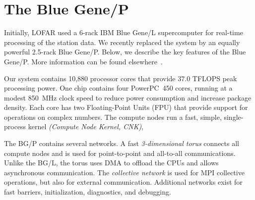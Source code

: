 \documentclass{sig-alternate}
\begin{document}
\section{The Blue Gene/P}
\label{sec:BG/P}

Initially, LOFAR used a 6-rack IBM Blue Gene/L supercomputer for real-time
processing of the station data.
We recently replaced the system by an equally powerful 2.5-rack Blue Gene/P.
Below, we describe the key features of the Blue Gene/P.
More information can be found elsewhere~\cite{IBM:08}.

Our system contains 10,880 processor cores that provide 37.0 TFLOPS peak
processing power.
One chip contains four PowerPC~450 cores, running at a modest 850~MHz clock
speed to reduce power consumption and increase package density.
Each core has two Floating-Point Units (FPU) that provide support for
operations on complex numbers.
The compute nodes run a fast, simple, single-process kernel
\emph{(Compute Node Kernel, CNK)},


The BG/P contains several networks.
A fast \emph{3-dimensional torus\/} connects all compute nodes and is used
for point-to-point and all-to-all communications.
Unlike the BG/L, the torus uses DMA to offload the CPUs and allows
asynchronous communication.
The \emph{collective network\/} is used for MPI collective operations,
but also for external communication.
Additional networks exist for fast barriers, initialization, diagnostics, and debugging.
\end{document}
